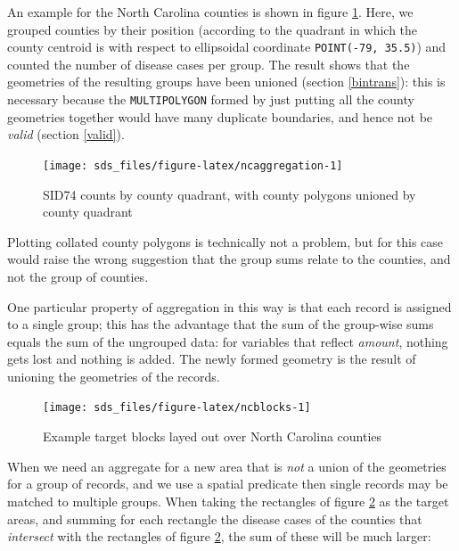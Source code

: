 \documentclass[]{book}
\begin{document}
An example for the North Carolina counties is shown in figure
\ref{fig:ncaggregation}. Here, we grouped counties by their position
(according to the quadrant in which the county centroid is with
respect to ellipsoidal coordinate \texttt{POINT(-79,\ 35.5)}) and counted
the number of disease cases per group. The result shows that
the geometries of the resulting groups have been unioned (section
\ref{bintrans}): this is necessary because the \texttt{MULTIPOLYGON}
formed by just putting all the county geometries together would
have many duplicate boundaries, and hence not be \emph{valid} (section
\ref{valid}).

\begin{figure}

{\centering \texttt{[image: sds\_files/figure-latex/ncaggregation-1]} 

}

\caption{SID74 counts by county quadrant, with county polygons unioned by county quadrant}\label{fig:ncaggregation}
\end{figure}

Plotting collated county polygons is technically not a problem, but
for this case would raise the wrong suggestion that the group sums
relate to the counties, and not the group of counties.

One particular property of aggregation in this way is that each
record is assigned to a single group; this has the advantage that
the sum of the group-wise sums equals the sum of the ungrouped data:
for variables that reflect \emph{amount}, nothing gets lost and nothing
is added. The newly formed geometry is the result of unioning the
geometries of the records.

\begin{figure}

{\centering \texttt{[image: sds\_files/figure-latex/ncblocks-1]} 

}

\caption{Example target blocks layed out over North Carolina counties}\label{fig:ncblocks}
\end{figure}

When we need an aggregate for a new area that is \emph{not} a union of the
geometries for a group of records, and we use a spatial predicate
then single records may be matched to multiple groups. When taking
the rectangles of figure \ref{fig:ncblocks} as the target areas,
and summing for each rectangle the disease cases of the counties
that \emph{intersect} with the rectangles of figure \ref{fig:ncblocks},
the sum of these will be much larger:
\end{document}
